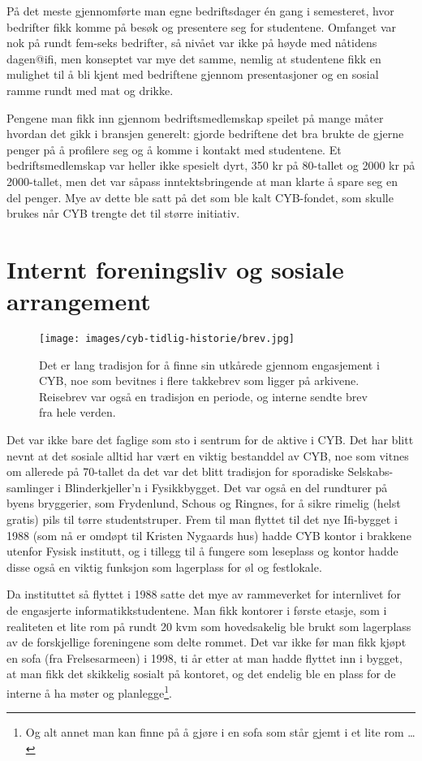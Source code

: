På det meste gjennomførte man egne bedriftsdager én gang i semesteret, hvor bedrifter fikk komme på besøk og presentere seg for studentene. Omfanget var nok på rundt fem-seks bedrifter, så nivået var ikke på høyde med nåtidens dagen@ifi, men konseptet var mye det samme, nemlig at studentene fikk en mulighet til å bli kjent med bedriftene gjennom presentasjoner og en sosial ramme rundt med mat og drikke.

Pengene man fikk inn gjennom bedriftsmedlemskap speilet på mange måter hvordan det gikk i bransjen generelt: gjorde bedriftene det bra brukte de gjerne penger på å profilere seg og å komme i kontakt med studentene. Et bedriftsmedlemskap var heller ikke spesielt dyrt, 350 kr på 80-tallet og 2000 kr på 2000-tallet, men det var såpass inntektsbringende at man klarte å spare seg en del penger. Mye av dette ble satt på det som ble kalt CYB-fondet, som skulle brukes når CYB trengte det til større initiativ.

\section{Internt foreningsliv og sosiale arrangement}

\begin{wrapfigure}{r}{7cm}
	\vspace{-20pt}
	\centering
	\texttt{[image: images/cyb-tidlig-historie/brev.jpg]}
	\caption{Det er lang tradisjon for å finne sin utkårede gjennom engasjement i CYB, noe som bevitnes i flere takkebrev som ligger på arkivene. Reisebrev var også en tradisjon en periode, og interne sendte brev fra hele verden.}
\end{wrapfigure}

Det var ikke bare det faglige som sto i sentrum for de aktive i CYB. Det har blitt nevnt at det sosiale alltid har vært en viktig bestanddel av CYB, noe som vitnes om allerede på 70-tallet da det var det blitt tradisjon for sporadiske Selskabs-samlinger i Blinderkjeller’n i Fysikkbygget. Det var også en del rundturer på byens bryggerier, som Frydenlund, Schous og Ringnes, for å sikre rimelig (helst gratis) pils til tørre studentstruper. Frem til man flyttet til det nye Ifi-bygget i 1988 (som nå er omdøpt til Kristen Nygaards hus) hadde CYB kontor i brakkene utenfor Fysisk institutt, og i tillegg til å fungere som leseplass og kontor hadde disse også en viktig funksjon som lagerplass for øl og festlokale.

Da instituttet så flyttet i 1988 satte det mye av rammeverket for internlivet for de engasjerte informatikkstudentene. Man fikk kontorer i første etasje, som i realiteten et lite rom på rundt 20 kvm som hovedsakelig ble brukt som lagerplass av de forskjellige foreningene som delte rommet. Det var ikke før man fikk kjøpt en sofa (fra Frelsesarmeen) i 1998, ti år etter at man hadde flyttet inn i bygget, at man fikk det skikkelig sosialt på kontoret, og det endelig ble en plass for de interne å ha møter og planlegge\footnote{Og alt annet man kan finne på å gjøre i en sofa som står gjemt i et lite rom \dots}.

